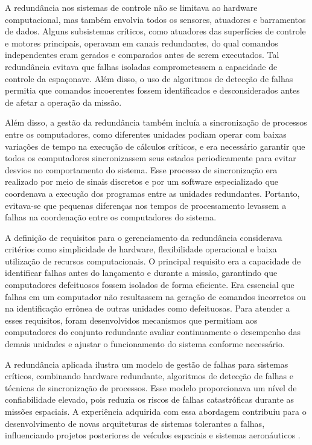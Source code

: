 A redundância nos sistemas de controle não se limitava ao hardware computacional, mas também envolvia todos os sensores, atuadores e barramentos de dados. Alguns subsistemas críticos, como atuadores das superfícies de controle e motores principais, operavam em canais redundantes, do qual comandos independentes eram gerados e comparados antes de serem executados. Tal redundância evitava que falhas isoladas comprometessem a capacidade de controle da espaçonave. Além disso, o uso de algoritmos de detecção de falhas permitia que comandos incoerentes fossem identificados e desconsiderados antes de afetar a operação da missão.

Além disso, a gestão da redundância também incluía a sincronização de processos entre os computadores, como diferentes unidades podiam operar com baixas variações de tempo na execução de cálculos críticos, e era necessário garantir que todos os computadores sincronizassem seus estados periodicamente para evitar desvios no comportamento do sistema. Esse processo de sincronização era realizado por meio de sinais discretos e por um software especializado que coordenava a execução dos programas entre as unidades redundantes. Portanto, evitava-se que pequenas diferenças nos tempos de processamento levassem a falhas na coordenação entre os computadores do sistema.

A definição de requisitos para o gerenciamento da redundância considerava critérios como simplicidade de hardware, flexibilidade operacional e baixa utilização de recursos computacionais. O principal requisito era a capacidade de identificar falhas antes do lançamento e durante a missão, garantindo que computadores defeituosos fossem isolados de forma eficiente. Era essencial que falhas em um computador não resultassem na geração de comandos incorretos ou na identificação errônea de outras unidades como defeituosas. Para atender a esses requisitos, foram desenvolvidos mecanismos que permitiam aos computadores do conjunto redundante avaliar continuamente o desempenho das demais unidades e ajustar o funcionamento do sistema conforme necessário.

A redundância aplicada ilustra um modelo de gestão de falhas para sistemas críticos, combinando hardware redundante, algoritmos de detecção de falhas e técnicas de sincronização de processos. Esse modelo proporcionava um nível de confiabilidade elevado, pois reduzia os riscos de falhas catastróficas durante as missões espaciais. A experiência adquirida com essa abordagem contribuiu para o desenvolvimento de novas arquiteturas de sistemas tolerantes a falhas, influenciando projetos posteriores de veículos espaciais e sistemas aeronáuticos \cite{sklaroff1976}.
